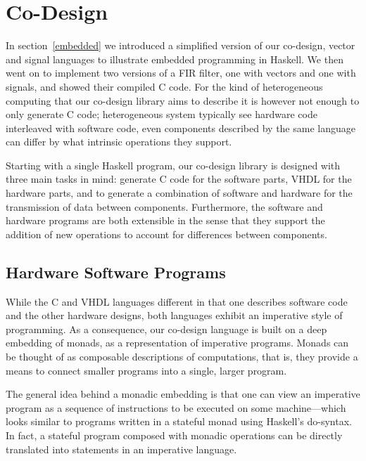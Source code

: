 \documentclass[../main.tex]{subfiles}
\begin{document}
\chapter{Co-Design}
\label{codesign}

In section~\ref{embedded} we introduced a simplified version of our co-design, vector and signal languages to illustrate embedded programming in Haskell. We then went on to implement two versions of a FIR filter, one with vectors and one with signals, and showed their compiled C code. For the kind of heterogeneous computing that our co-design library aims to describe it is however not enough to only generate C code; heterogeneous system typically see hardware code interleaved with software code, even components described by the same language can differ by what intrinsic operations they support.


Starting with a single Haskell program, our co-design library is designed with three main tasks in mind: generate C code for the software parts, VHDL for the hardware parts, and to generate a combination of software and hardware for the transmission of data between components. Furthermore, the software and hardware programs are both extensible in the sense that they support the addition of new operations to account for differences between components.

\section{Hardware Software Programs}
\label{program}

While the C and VHDL languages different in that one describes software code and the other hardware designs, both languages exhibit an imperative style of programming. As a consequence, our co-design language is built on a deep embedding of monads, as a representation of imperative programs. Monads can be thought of as composable descriptions of computations, that is, they provide a means to connect smaller programs into a single, larger program.

The general idea behind a monadic embedding is that one can view an imperative program as a sequence of instructions to be executed on some machine---which looks similar to programs written in a stateful monad using Haskell's do-syntax. In fact, a stateful program composed with monadic operations can be directly translated into statements in an imperative language.
\end{document}
